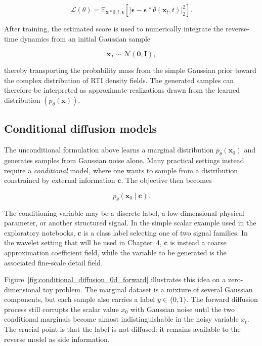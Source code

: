 \begin{equation}
\mathcal{L}(\theta)
=
\mathbb{E}_{\mathbf{x}*0,t,\boldsymbol{\epsilon}}
\left[
\left|
\boldsymbol{\epsilon}
-
\boldsymbol{\epsilon}*{\theta}
(\mathbf{x}_t,t)
\right|_2^2
\right].
\end{equation}

After training, the estimated score is used to numerically integrate the reverse-time dynamics from an initial Gaussian sample

\begin{equation}
\mathbf{x}_T
\sim
\mathcal{N}(\mathbf{0},\mathbf{I}),
\end{equation}

thereby transporting the probability mass from the simple Gaussian prior toward the complex distribution of RTI density fields. The generated samples can therefore be interpreted as approximate realizations drawn from the learned distribution $(p_{\theta}(\mathbf{x}))$.


\subsection{Conditional diffusion models}

The unconditional formulation above learns a marginal distribution
$p_{\theta}(\mathbf{x}_0)$ and generates samples from Gaussian noise alone.
Many practical settings instead require a \emph{conditional} model, where one
wants to sample from a distribution constrained by external information
$\mathbf{c}$. The objective then becomes

\begin{equation}
    p_{\theta}(\mathbf{x}_0 \mid \mathbf{c}).
\end{equation}

The conditioning variable may be a discrete label, a low-dimensional physical
parameter, or another structured signal. In the simple scalar example used in
the exploratory notebooks, $\mathbf{c}$ is a class label selecting one of two
signal families. In the wavelet setting that will be used in Chapter~4,
$\mathbf{c}$ is instead a coarse approximation coefficient field, while the
variable to be generated is the associated fine-scale detail field.

Figure~\ref{fig:conditional_diffusion_0d_forward} illustrates this idea on a
zero-dimensional toy problem. The marginal dataset is a mixture of several
Gaussian components, but each sample also carries a label $y\in\{0,1\}$. The
forward diffusion process still corrupts the scalar value $x_0$ with Gaussian
noise until the two conditional marginals become almost indistinguishable in
the noisy variable $x_t$. The crucial point is that the label is not diffused:
it remains available to the reverse model as side information.

